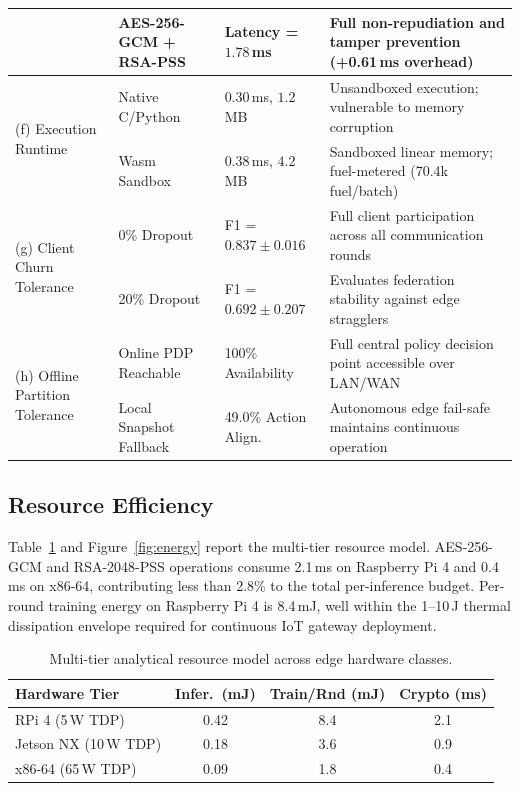 \documentclass[iicol,sn-mathphys,Numbered]{sn-jnl}
\begin{document}
\begin{table}[t]
\begin{tabularx}{\textwidth}{@{}p{3.8cm}p{3.2cm}p{2.8cm}X@{}}
                                          & AES-256-GCM + RSA-PSS & Latency = $1.78$\,ms & Full non-repudiation and tamper prevention (+0.61\,ms overhead) \\
\midrule
\multirow{2}{=}{(f) Execution Runtime} & Native C/Python & $0.30$\,ms, $1.2$\,MB & Unsandboxed execution; vulnerable to memory corruption \\
                                        & Wasm Sandbox    & $0.38$\,ms, $4.2$\,MB & Sandboxed linear memory; fuel-metered (70.4k fuel/batch) \\
\midrule
\multirow{2}{=}{(g) Client Churn Tolerance} & 0\% Dropout  & F1 = $0.837 \pm 0.016$ & Full client participation across all communication rounds \\
                                   & 20\% Dropout & F1 = $0.692 \pm 0.207$ & Evaluates federation stability against edge stragglers \\
\midrule
\multirow{2}{=}{(h) Offline Partition Tolerance} & Online PDP Reachable & 100\% Availability & Full central policy decision point accessible over LAN/WAN \\
                                          & Local Snapshot Fallback & 49.0\% Action Align. & Autonomous edge fail-safe maintains continuous operation \\
\bottomrule
\end{tabularx}
\end{table}

\subsection{Resource Efficiency}\label{sec:resources}
Table~\ref{tab:energy} and Figure~\ref{fig:energy} report the multi-tier resource model. AES-256-GCM and RSA-2048-PSS operations consume 2.1\,ms on Raspberry Pi 4 and 0.4\,ms on x86-64, contributing less than 2.8\% to the total per-inference budget. Per-round training energy on Raspberry Pi 4 is 8.4\,mJ, well within the 1--10\,J thermal dissipation envelope required for continuous IoT gateway deployment.

\begin{table}[htbp]
\caption{Multi-tier analytical resource model across edge hardware classes.}\label{tab:energy}
\centering\footnotesize
\setlength{\tabcolsep}{3pt}
\begin{tabular*}{\columnwidth}{@{\extracolsep{\fill}}lccc@{}}
\toprule
\textbf{Hardware Tier} & \textbf{Infer.\ (mJ)} & \textbf{Train/Rnd (mJ)} & \textbf{Crypto (ms)} \\
\midrule
RPi 4 (5\,W TDP)           & 0.42 & 8.4 & 2.1 \\
Jetson NX (10\,W TDP)      & 0.18 & 3.6 & 0.9 \\
x86-64 (65\,W TDP)         & 0.09 & 1.8 & 0.4 \\
\bottomrule
\end{tabular*}
\end{table}
\end{document}
